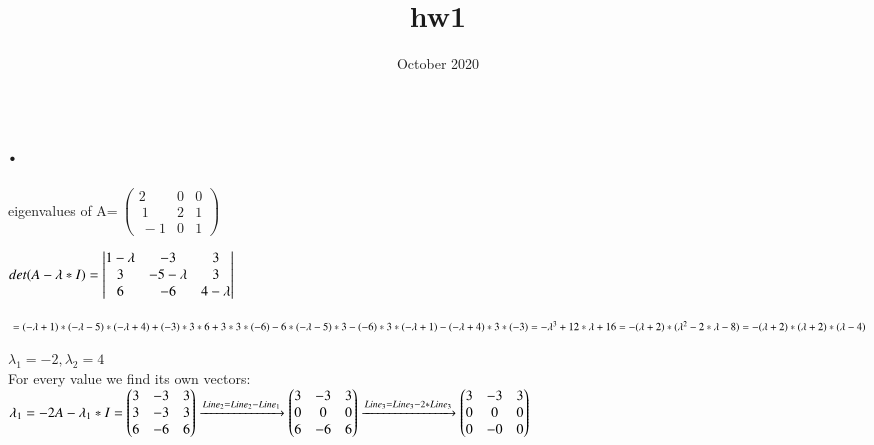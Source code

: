 \documentclass{article}
\title{hw1}
\date{October 2020}
\begin{document}
\maketitle

\section{.}

eigenvalues of A=$\:\begin{pmatrix}2&0&0\\ \:1&2&1\\ \:-1&0&1\end{pmatrix}$

$\\det(A-\lambda *I)=\begin{vmatrix}
1-\lambda & -3 & 3 \\
3 & -5-\lambda & 3 \\
6 & -6 & 4-\lambda
\end{vmatrix}$

$\\=(-\lambda+1)*(-\lambda-5)*(-\lambda+4)+(-3)*3*6+3*3*(-6)-6*(-\lambda-5)*3-(-6)*3*(-\lambda+1)-(-\lambda+4)*3*(-3)=-\lambda^3+12*\lambda+16=-(\lambda+2)*(\lambda^2-2*\lambda-8)=-(\lambda+2)*(\lambda+2)*(\lambda-4) $

$ \lambda_1=-2,\lambda_2=4$\\
For every value we find its own vectors:\\
$\lambda_1=-2\\
A-\lambda_1*I=\left(\begin{matrix}
3 & -3 & 3 \\
3 & -3 & 3 \\
6 & -6 & 6
\end{matrix}\right)\xrightarrow{Line_2=Line_2 - Line_1}
\left(\begin{matrix}
3 & -3 & 3  \\
0 & 0 & 0  \\
6 & -6 & 6
\end{matrix}\right)\xrightarrow{Line_3=Line_3 - 2*Line_3}
\left(\begin{matrix}
3 & -3 & 3  \\
0 & 0 & 0  \\
0 & -0 & 0
\end{matrix}\right)$
\end{document}
